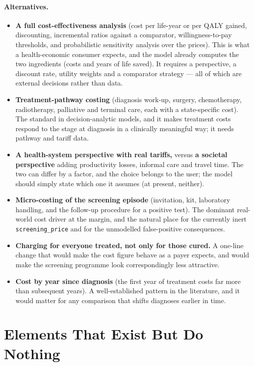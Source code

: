 \documentclass[12pt,a4paper]{article}
\newcommand{\id}[1]{\texttt{#1}}
\newcommand{\alt}[1]{\paragraph{Alternatives.} #1}
\begin{document}
\alt{\begin{itemize}[nosep]
  \item \textbf{A full cost-effectiveness analysis} (cost per life-year or per QALY gained, discounting,
        incremental ratios against a comparator, willingness-to-pay thresholds, and probabilistic
        sensitivity analysis over the prices). This is what a health-economic consumer expects, and the
        model already computes the two ingredients (costs and years of life saved). It requires a
        perspective, a discount rate, utility weights and a comparator strategy --- all of which are
        external decisions rather than data.
  \item \textbf{Treatment-pathway costing} (diagnosis work-up, surgery, chemotherapy, radiotherapy,
        palliative and terminal care, each with a state-specific cost). The standard in decision-analytic
        models, and it makes treatment costs respond to the stage at diagnosis in a clinically meaningful
        way; it needs pathway and tariff data.
  \item \textbf{A health-system perspective with real tariffs,} versus \textbf{a societal perspective}
        adding productivity losses, informal care and travel time. The two can differ by a factor, and the
        choice belongs to the user; the model should simply state which one it assumes (at present,
        neither).
  \item \textbf{Micro-costing of the screening episode} (invitation, kit, laboratory handling, and the
        follow-up procedure for a positive test). The dominant real-world cost driver at the margin, and the
        natural place for the currently inert \id{screening\_price} and for the unmodelled false-positive
        consequences.
  \item \textbf{Charging for everyone treated, not only for those cured.} A one-line change that would make
        the cost figure behave as a payer expects, and would make the screening programme look
        correspondingly less attractive.
  \item \textbf{Cost by year since diagnosis} (the first year of treatment costs far more than subsequent
        years). A well-established pattern in the literature, and it would matter for any comparison that
        shifts diagnoses earlier in time.
\end{itemize}}

\section{Elements That Exist But Do Nothing}
\label{sec:inactive}
\end{document}
